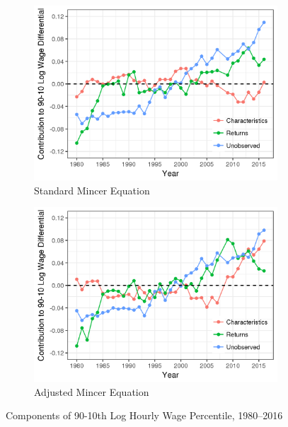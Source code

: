 \documentclass[notitlepage,12pt]{article}
\begin{document}
\begin{figure}[h]
\centering
\begin{subfigure}{.5\textwidth}
  \centering
  \includegraphics[width=\textwidth, height = 0.8\textwidth]{edit1.png}
  \caption{Standard Mincer Equation}
\end{subfigure}%
\begin{subfigure}{.5\textwidth}
  \centering
  \includegraphics[width=\textwidth, height = 0.8\textwidth]{edit2.png}
  \caption{Adjusted Mincer Equation}
\end{subfigure}
\caption{Components of 90-10th Log Hourly Wage Percentile, 1980--2016}
\end{figure}
\end{document}
